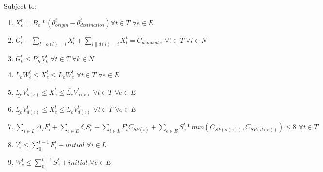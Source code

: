 \documentclass{article}
\begin{document}
	Subject to:
	\begin{enumerate}[label=(\arabic*), leftmargin=*, itemsep=0.4ex, before={\everymath{\displaystyle}}]%
		
		\item $ X_e^t = B_e * (\theta_{origin}^t - \theta_{destination}^t) \forall t \in T \hspace{4pt} \forall e \in E$
		\item $ G_i^t - \sum_{l\|o(l)=i} X_l^t + \sum_{l\|d(l)=i} X_l^t = C_{demand\_i} \hspace{4pt} \forall t \in T \hspace{4pt} \forall i \in N$
		\item $G_k^t \leq P_{K} V_{k}^t \hspace{4pt} \forall t\in T \hspace{4pt} \forall k \in N$
		\item $\underline{L_e}W_{e}^t \leq X_{e}^t \leq \overline{L_e}W_{e}^t \hspace{4pt} \forall t \in T \hspace{4pt} \forall e \in E$
		\item $\underline{L_e}V_{o(e)}^t \leq X_{e}^t \leq \overline{L_e}V_{o(e)}^t \hspace{4pt} \forall t \in T \hspace{4pt} \forall e \in E$
		\item $\underline{L_e}V_{d(e)}^t \leq X_{e}^t \leq \overline{L_e}V_{d(e)}^t \hspace{4pt} \forall t \in T \hspace{4pt} \forall e \in E$
		
		\item $\sum_{i \in L} \Delta_{I} F_{i}^t +\sum_{e \in E} \delta_{e} S_{e}^t + \sum_{i \in L} F_i^t C_{SP(i)} + \sum_{e \in E} S_{e}^t * min(C_{SP(o(e))},C_{SP(d(e))}) \leq 8 \hspace{4pt} \forall t \in T \hspace{4pt}$
		\item $V_i^t \leq \sum_{0}^{t-1} F_i^t+initial \hspace{4pt} \forall i \in L$ 
		\item $W_{e}^t \leq \sum_{0}^{t-1} S_{e}^t+initial \hspace{4pt} \forall e \in E $
	\end{enumerate}
\end{document}
